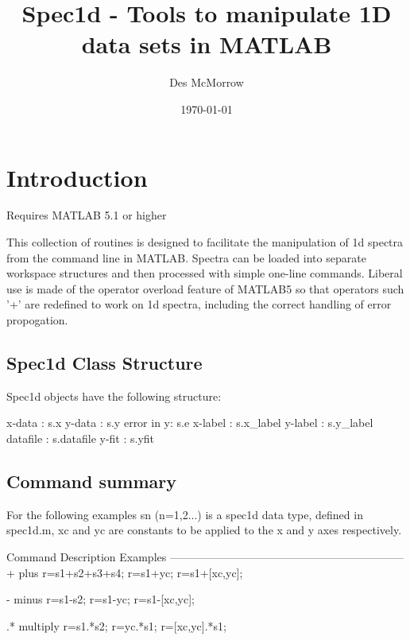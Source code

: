 \documentclass[a4paper]{article}
\begin{document}
\title{Spec1d - Tools to manipulate 1D data sets in MATLAB}

\author{Des McMorrow}

\date{\today}

\maketitle

\section{Introduction}

Requires MATLAB 5.1 or higher

This collection of routines is designed to facilitate 
the manipulation of 1d spectra from the command line
in MATLAB. Spectra can be loaded into separate workspace 
structures and then processed with simple one-line 
commands. Liberal use is made of the
operator overload feature of MATLAB5 so that operators
such '+' are redefined to work on 1d spectra, including
the correct handling of error propogation.

\subsection{Spec1d Class Structure}

Spec1d objects have the following structure:

x-data    :     s.x
y-data    :     s.y
error in y:     s.e
x-label   :     s.x_label
y-label   :     s.y_label
datafile  :     s.datafile
y-fit     :     s.yfit

\subsection{Command summary}

For the following examples sn (n=1,2...) is a spec1d data type, 
defined in spec1d.m, xc and yc are constants to be applied 
to the x and y axes respectively. 

Command		Description			Examples
---------------------------------------------------------------
+		plus				r=s1+s2+s3+s4;
                                                r=s1+yc;
                                                r=s1+[xc,yc];

-		minus				r=s1-s2;
                                                r=s1-yc;
                                                r=s1-[xc,yc];

.*		multiply			r=s1.*s2; 
                                                r=yc.*s1;
                                                r=[xc,yc].*s1;
\end{document}
